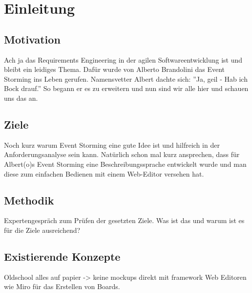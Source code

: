 \chapter{Einleitung}\label{ch:einleitung}

\section{Motivation}\label{sec:motivation}
Ach ja das Requirements Engineering in der agilen Softwareentwicklung ist
und bleibt ein leidiges Thema.
Dafür wurde von Alberto Brandolini das Event Storming ins Leben gerufen.
Namensvetter Albert dachte sich: ''Ja, geil - Hab ich Bock drauf.''
So begann er es zu erweitern und nun sind wir alle hier und schauen uns das an.

\section{Ziele}\label{sec:ziele}
Noch kurz warum Event Storming eine gute Idee ist und hilfreich in der
Anforderungsanalyse sein kann.
Natürlich schon mal kurz ansprechen, dass für Albert(o)s Event Storming eine
Beschreibungssprache entwickelt wurde und man diese zum einfachen Bedienen
mit einem Web-Editor versehen hat.

\section{Methodik}\label{sec:methodik}
Expertengespräch zum Prüfen der gesetzten Ziele.
Was ist das und warum ist es für die Ziele ausreichend?

\section{Existierende Konzepte}\label{sec:existierende-konzepte}
Oldschool alles auf papier -> keine mockups direkt mit framework
Web Editoren wie Miro für das Erstellen von Boards.

